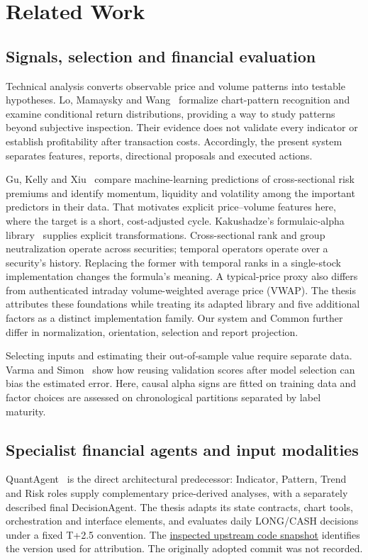 \chapter{Related Work}\label{s:9827c64bef49c4b1}
\section{Signals, selection and financial evaluation}\label{s:14b05e24677e26cb}
Technical analysis converts observable price and volume patterns into
testable hypotheses. Lo, Mamaysky and Wang~\cite{lo2000technical} formalize chart-pattern
recognition and examine conditional return distributions, providing a
way to study patterns beyond subjective inspection. Their evidence does
not validate every indicator or establish profitability after transaction
costs. Accordingly, the present system separates
features, reports, directional proposals and executed actions.

Gu, Kelly and Xiu~\cite{gu2020assetpricing} compare machine-learning
predictions of cross-sectional risk premiums and identify momentum,
liquidity and volatility among the important predictors in their data.
That motivates explicit price--volume features here, where the target
is a short, cost-adjusted cycle. Kakushadze's formulaic-alpha library~\cite{kakushadze2016formulaic} supplies explicit transformations.
Cross-sectional rank and group neutralization operate across securities;
temporal operators operate over a security's history. Replacing the
former with temporal ranks in a single-stock implementation changes the
formula's meaning. A typical-price proxy also differs from authenticated
intraday volume-weighted average price (VWAP). The thesis attributes
these foundations while treating its adapted library and five additional
factors as a distinct implementation family. Our system and Common further
differ in normalization, orientation, selection and report projection.

Selecting inputs and estimating their out-of-sample value require
separate data. Varma and Simon~\cite{varma2006bias} show how reusing
validation scores after model selection can bias the estimated error.
Here, causal alpha signs are fitted on training data and factor choices
are assessed on chronological partitions separated by label maturity.

\section{Specialist financial agents and input modalities}\label{s:f7594e9d067d74c3}
QuantAgent~\cite{xiong2025quantagent} is the direct architectural predecessor: Indicator, Pattern,
Trend and Risk roles supply complementary price-derived analyses, with
a separately described final DecisionAgent. The thesis adapts its state
contracts, chart tools, orchestration and interface elements, and evaluates
daily LONG/CASH decisions under a fixed T+2.5 convention.
The
\href{https://github.com/Y-Research-SBU/QuantHarness/tree/92519f806286192345e940e7ab77496462d662b7}{inspected upstream code snapshot}
identifies the version used for attribution. The originally adopted
commit was not recorded.

